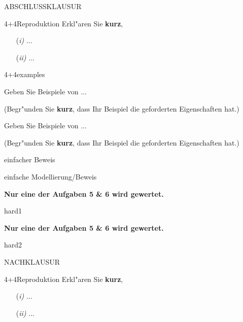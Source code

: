 \documentclass[a4paper]{article}
\begin{document}
\pagebreak

ABSCHLUSSKLAUSUR

\begin{klaufg}{4+4}{Reproduktion}
  Erkl"aren Sie {\bfseries\sffamily kurz},

\begin{enumerate} %
\item[(\it i)] ...
   \vfill
\item[(\it ii)] ...
 \vfill
\end{enumerate}

\end{klaufg}

\pagebreak
\begin{klaufg}{4+4}{examples}


  Geben Sie Beispiele von ...

  (Begr"unden Sie {\bfseries\sffamily kurz}, dass Ihr Beispiel die
  geforderten Eigenschaften hat.)
  \pagebreak
  
    Geben Sie Beispiele von ...
  
  (Begr"unden Sie {\bfseries\sffamily kurz}, dass Ihr Beispiel die
  geforderten Eigenschaften hat.)

\end{klaufg}

\pagebreak
\begin{klaufg}{8}{einfacher Beweis}

\end{klaufg}

\pagebreak
\begin{klaufg}{8}{einfache Modellierung/Beweis}

  
\end{klaufg}
 
\pagebreak
{\bfseries Nur eine der Aufgaben 5 \& 6 wird gewertet.}
\bigskip
\bigskip

\begin{klaufg}{8}{hard1}

\end{klaufg}

\pagebreak
{\bfseries Nur eine der Aufgaben 5 \& 6 wird gewertet.}
\bigskip
\bigskip

\begin{klaufg}{8}{hard2}

\end{klaufg}

\pagebreak
NACHKLAUSUR

\begin{klaufg}{4+4}{Reproduktion}
  Erkl"aren Sie {\bfseries\sffamily kurz},

\begin{enumerate} %
\item[(\it i)] ...
   \vfill
\item[(\it ii)] ...
 \vfill
\end{enumerate}

\end{klaufg}
\end{document}
